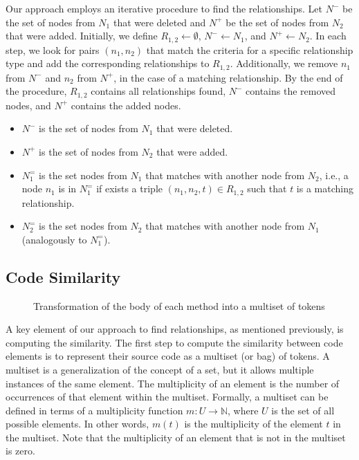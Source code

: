 Our approach employs an iterative procedure to find the relationships.
Let $N^-$ be the set of nodes from $N_1$ that were deleted and $N^+$ be the set of nodes from $N_2$ that were added.
Initially, we define $R_{1,2} \gets \emptyset$, $N^- \gets N_1$, and $N^+ \gets N_2$.
In each step, we look for pairs $(n_1, n_2)$ that match the criteria for a specific relationship type and add the corresponding relationships to $R_{1,2}$.
Additionally, we remove $n_1$ from $N^-$ and $n_2$ from $N^+$, in the case of a matching relationship.
By the end of the procedure, $R_{1,2}$ contains all relationships found, $N^-$ contains the removed nodes, and $N^+$ contains the added nodes.


\begin{itemize}
\item $N^-$ is the set of nodes from $N_1$ that were deleted.
\item $N^+$ is the set of nodes from $N_2$ that were added.
\item $N_1^=$ is the set nodes from $N_1$ that matches with another node from $N_2$, i.e., a node $n_1$ is in $N_1^=$ if exists a triple $(n_1, n_2, t) \in R_{1,2}$ such that $t$ is a matching relationship.
\item $N_2^=$ is the set nodes from $N_2$ that matches with another node from $N_1$ (analogously to $N_1^=$).
\end{itemize}






\subsection{Code Similarity}
\label{SecCodeSim}

\begin{figure}[htb]
\renewcommand{\arraystretch}{1.3}
\centering
\footnotesize

\caption{Transformation of the body of each method into a multiset of tokens}
\label{FigSourceCodeTransformation}
\end{figure}

A key element of our approach to find relationships, as mentioned previously, is computing the similarity.
The first step to compute the similarity between code elements is to represent their source code as a multiset (or bag) of tokens.
A multiset is a generalization of the concept of a set, but it allows multiple instances of the same element.
The multiplicity of an element is the number of occurrences of that element within the multiset. Formally, a multiset can be defined in terms of a multiplicity function $m: U \to \mathbb{N}$, where $U$ is the set of all possible elements. In other words, $m(t)$ is the multiplicity of the element $t$ in the multiset. Note that the multiplicity of an element that is not in the multiset is zero.

